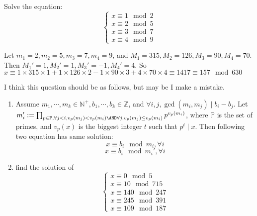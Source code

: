 \documentclass{ctexart}
\begin{document}
\begin{problem}\label{pro:p55.1ii}
  Solve the equation:
  \[
    \begin{cases}
      x \equiv 1 \mod 2 \\
      x \equiv 2 \mod 5 \\
      x \equiv 3 \mod 7 \\
      x \equiv 4 \mod 9
    \end{cases}
  \]
\end{problem}
\begin{solution}
  Let \(m_1=2,m_2=5,m_3=7,m_4=9\), and \(M_1=315,M_2=126,M_3=90,M_4=70\).
  Then \(M_1'=1,M_2'=1,M_3'=-1,M_4'=4\).
  So \(x \equiv 1 \times 315 \times 1 + 1 \times 126 \times 2 - 1 \times 90 \times 3 + 4 \times 70 \times 4 \equiv 1417\equiv 157\mod 630\)
\end{solution}
I think this question should be as follows, but may be I make a mistake.
\begin{problem}\label{pro:3}
  \begin{enumerate}
    \item
      Assume \(m_1,\cdots,m_k \in \mathbb{N}^+,b_1,\cdots,b_k \in \mathbb{Z}\), and \(\forall i,j,\gcd(m_i,m_j) \mid b_i-b_j\).
      Let \(m_i':=\prod_{p \in \mathbb{P},\forall j <i,v_p(m_j)<v_p(m_i) \AND \forall j,v_p(m_j) \leq v_p(m_i)} p^{v_p(m_i)}\), where
      \(\mathbb{P}\) is the set of primes, and \(v_p(x)\) is the biggest integer \(t\) such that \(p^t \mid x\).
      Then following two equation has same solution:
      \begin{equation}\label{equ:1}
        x \equiv b_i \mod m_i,\forall i
      \end{equation}
      \begin{equation}\label{equ:2}
        x \equiv b_i \mod m_i',\forall i
      \end{equation}
    \item find the solution of
      \[
        \begin{cases}
          x \equiv 0 \mod 5     \\
          x \equiv 10 \mod 715  \\
          x \equiv 140 \mod 247 \\
          x \equiv 245 \mod 391 \\
          x \equiv 109 \mod 187
        \end{cases}
      \]
  \end{enumerate}
\end{problem}
\end{document}
